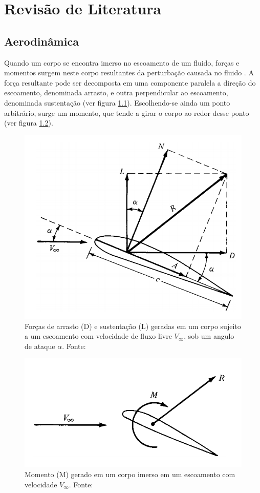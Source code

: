 \chapter{Revisão de Literatura}\label{chp:rev}

\section{Aerodinâmica}

Quando um corpo se encontra imerso no escoamento de um fluido, forças e momentos surgem neste corpo resultantes da perturbação causada no fluido \citep{anderson1984fundamentals}. A força resultante pode ser decomposta em uma componente paralela a direção do escoamento, denominada arrasto, e outra perpendicular ao escoamento, denominada sustentação (ver figura \ref{fig:aero_profile_forces}). Escolhendo-se ainda um ponto arbitrário, surge um momento, que tende a girar o corpo ao redor desse ponto (ver figura \ref{fig:aero_profile_momentum}).

\begin{figure}[H]
    \centering
    \includegraphics[width=.8\linewidth]{figuras/outras/anderson_profile_forces.png}
    \caption{Forças de arrasto (D) e sustentação (L) geradas em um corpo sujeito a um escoamento com velocidade de fluxo livre $V_{\infty}$, sob um angulo de ataque $\alpha$. Fonte: \cite{anderson1984fundamentals}}
    \label{fig:aero_profile_forces}
\end{figure}

\begin{figure}[H]
    \centering
    \includegraphics[width=.8\linewidth]{figuras/outras/anderson_profile_momentum.png}
    \caption{Momento (M) gerado em um corpo imerso em um escoamento com velocidade $V_{\infty}$. Fonte: \cite{anderson1984fundamentals}}
    \label{fig:aero_profile_momentum}
\end{figure}

